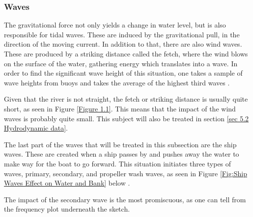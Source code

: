 \subsubsection{Waves}

The gravitational force not only yields a change in water level, but is also responsible for tidal waves. These are induced by the gravitational pull, in the direction of the moving current. 
In addition to that, there are also wind waves. These are produced by a striking distance called the fetch, where the wind blows on the surface of the water, gathering energy which translates into a wave. In order to find the significant wave height of this situation, one takes a sample of wave heights from buoys and takes the average of the highest third waves \autocite{arrigaSlidesLecture2}.

Given that the river is not straight, the fetch or striking distance is usually quite short, as seen in Figure \ref{Figure 1.1}. This means that the impact of the wind waves is probably quite small. This subject will also be treated in section \ref{sec 5.2 Hydrodynamic data}.

The last part of the waves that will be treated in this subsection are the ship waves. These are created when a ship passes by and pushes away the water to make way for the boat to go forward. This situation initiates three types of waves, primary, secondary, and propeller wash waves, as seen in Figure \ref{Fig:Ship Waves Effect on Water and Bank} below \autocite{Lecture12Ships}.

The impact of the secondary wave is the most promiscuous, as one can tell from the frequency plot underneath the sketch.

